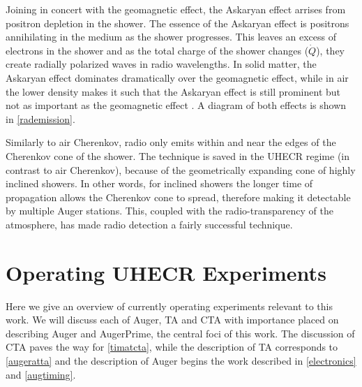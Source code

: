 Joining in concert with the geomagnetic effect, the Askaryan effect arrises from positron depletion in the shower. The essence of the Askaryan effect is positrons annihilating in the medium as the shower progresses. This leaves an excess of electrons in the shower and as the total charge of the shower changes ($\dot{Q}$), they create radially polarized waves in radio wavelengths. In solid matter, the Askaryan effect dominates dramatically over the geomagnetic effect, while in air the lower density makes it such that the Askaryan effect is still prominent but not as important as the geomagnetic effect \cite{schroeder}. A diagram of both effects is shown in \autoref{rademission}.

Similarly to air Cherenkov, radio only emits within and near the edges of the Cherenkov cone of the shower. The technique is saved in the UHECR regime (in contrast to air Cherenkov), because of the geometrically expanding cone of highly inclined showers. In other words, for inclined showers the longer time of propagation allows the Cherenkov cone to spread, therefore making it detectable by multiple Auger stations. This, coupled with the radio-transparency of the atmosphere, has made radio detection a fairly successful technique.
\newpage
\section{Operating UHECR Experiments}

Here we give an overview of currently operating experiments relevant to this work. We will discuss each of Auger, TA and CTA with importance placed on describing Auger and AugerPrime, the central foci of this work. The discussion of CTA paves the way for \autoref{timatcta}, while the description of TA corresponds to \autoref{augeratta} and the description of Auger begins the work described in \autoref{electronics} and \autoref{augtiming}.


